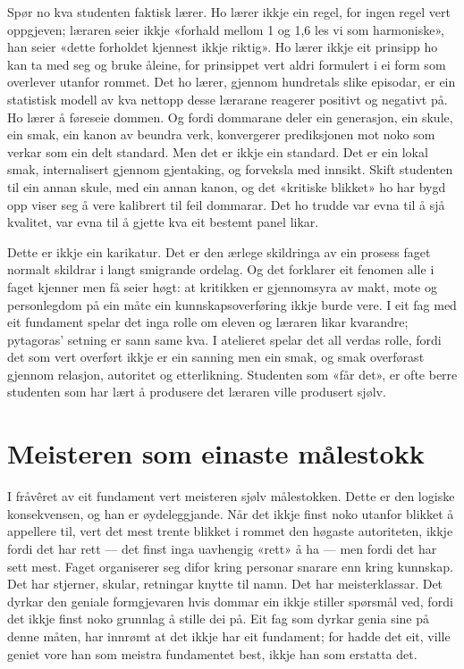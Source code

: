 Spør no kva studenten faktisk lærer. Ho lærer ikkje ein regel, for ingen regel vert oppgjeven; læraren seier ikkje «forhald mellom 1 og 1,6 les vi som harmoniske», han seier «dette forholdet kjennest ikkje riktig». Ho lærer ikkje eit prinsipp ho kan ta med seg og bruke åleine, for prinsippet vert aldri formulert i ei form som overlever utanfor rommet. Det ho lærer, gjennom hundretals slike episodar, er ein statistisk modell av kva nettopp desse lærarane reagerer positivt og negativt på. Ho lærer å føreseie dommen. Og fordi dommarane deler ein generasjon, ein skule, ein smak, ein kanon av beundra verk, konvergerer prediksjonen mot noko som verkar som ein delt standard. Men det er ikkje ein standard. Det er ein lokal smak, internalisert gjennom gjentaking, og forveksla med innsikt. Skift studenten til ein annan skule, med ein annan kanon, og det «kritiske blikket» ho har bygd opp viser seg å vere kalibrert til feil dommarar. Det ho trudde var evna til å sjå kvalitet, var evna til å gjette kva eit bestemt panel likar.

Dette er ikkje ein karikatur. Det er den ærlege skildringa av ein prosess faget normalt skildrar i langt smigrande ordelag. Og det forklarer eit fenomen alle i faget kjenner men få seier høgt: at kritikken er gjennomsyra av makt, mote og personlegdom på ein måte ein kunnskapsoverføring ikkje burde vere. I eit fag med eit fundament spelar det inga rolle om eleven og læraren likar kvarandre; pytagoras' setning er sann same kva. I atelieret spelar det all verdas rolle, fordi det som vert overført ikkje er ein sanning men ein smak, og smak overførast gjennom relasjon, autoritet og etterlikning. Studenten som «får det», er ofte berre studenten som har lært å produsere det læraren ville produsert sjølv.

\section{Meisteren som einaste målestokk}

I fråvêret av eit fundament vert meisteren sjølv målestokken. Dette er den logiske konsekvensen, og han er øydeleggjande. Når det ikkje finst noko utanfor blikket å appellere til, vert det mest trente blikket i rommet den høgaste autoriteten, ikkje fordi det har rett — det finst inga uavhengig «rett» å ha — men fordi det har sett mest. Faget organiserer seg difor kring personar snarare enn kring kunnskap. Det har stjerner, skular, retningar knytte til namn. Det har meisterklassar. Det dyrkar den geniale formgjevaren hvis dommar ein ikkje stiller spørsmål ved, fordi det ikkje finst noko grunnlag å stille dei på. Eit fag som dyrkar genia sine på denne måten, har innrømt at det ikkje har eit fundament; for hadde det eit, ville geniet vore han som meistra fundamentet best, ikkje han som erstatta det.

